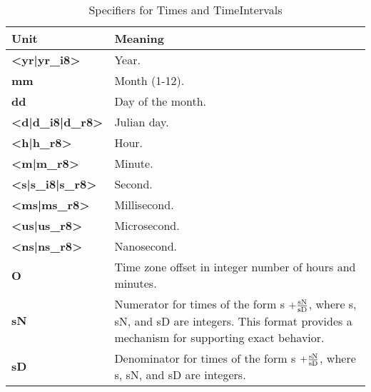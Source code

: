 \newpage
\begin{center}
\begin{table}
\caption{\label{table:timeOpts}Specifiers for Times and TimeIntervals}
\begin{tabular}{|p{1in}|p{3.5in}|}
\hline
Unit & Meaning \\
\hline\hline
{\bf <yr|yr\_i8>} & Year. \\
\hline
{\bf mm} & Month (1-12). \\
\hline
{\bf dd} & Day of the month. \\
\hline
{\bf <d|d\_i8|d\_r8>} & Julian day. \\
\hline
{\bf <h|h\_r8>} & Hour. \\
\hline
{\bf <m|m\_r8>} & Minute. \\
\hline
{\bf <s|s\_i8|s\_r8>} & Second. \\
\hline
{\bf <ms|ms\_r8>} & Millisecond. \\
\hline
{\bf <us|us\_r8>} & Microsecond. \\
\hline
{\bf <ns|ns\_r8>} & Nanosecond. \\
\hline
{\bf O} & Time zone offset in integer number of hours and minutes. \\
\hline
{\bf sN} & Numerator for times of the form s {\bf $ + 
\frac{{\rm sN}}{{\rm sD}}$}, where s, sN, and sD are integers.
This format provides a mechanism for supporting exact behavior. \\
\hline
{\bf sD} & Denominator for times of the form s {\bf $ + 
\frac{{\rm sN}}{{\rm sD}}$}, where s, sN, and sD are integers.
\\
\hline
\end{tabular}
\end{table}
\end{center}










